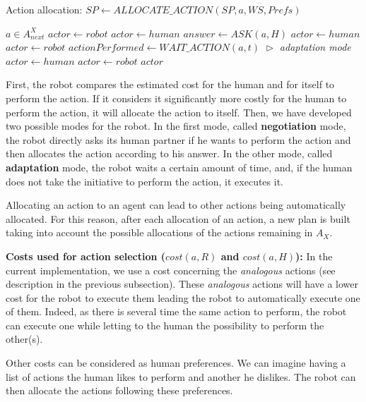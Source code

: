 \documentclass[english,a4paper,11pt,twoside]{StyleThese}
\begin{document}
\begin{algorithm}
\caption{Action allocation: $SP \leftarrow ALLOCATE\_ACTION(SP, a, WS, Prefs)$}
\label{alg:allocate}
\begin{algorithmic}
\REQUIRE $a \in A^X_{next}$
\STATE $actor \leftarrow robot$
\STATE $actor \leftarrow human$
\STATE $answer \leftarrow ASK(a, H)$
\STATE $actor \leftarrow human$
\ELSE
\STATE $actor \leftarrow robot$
\ENDIF
\ELSE
\STATE $actionPerformed \leftarrow WAIT\_ACTION(a, t)$
\hfill \textit{$\vartriangleright$ adaptation mode}
\STATE $actor \leftarrow human$
\ELSE
\STATE $actor \leftarrow robot$
\ENDIF
\ENDIF
\RETURN $actor$
\end{algorithmic}
\end{algorithm}

First, the robot compares the estimated cost for the human and for itself to perform the action. If it considers it significantly more costly for the human to perform the action, it will allocate the action to itself. Then, we have developed two possible modes for the robot. In the first mode, called \textbf{negotiation} mode, the robot directly asks its human partner if he wants to perform the action and then allocates the action according to his answer. In the other mode, called \textbf{adaptation} mode, the robot waits a certain amount of time, and, if the human does not take the initiative to perform the action, it executes it. 

Allocating an action to an agent can lead to other actions being automatically allocated. For this reason, after each allocation of an action, a new plan is built taking into account the possible allocations of the actions remaining in $A_X$.

\textbf{Costs used for action selection ($cost(a, R)$ and $cost(a, H)$):}
In the current implementation, we use a cost concerning the \textit{analogous} actions (see description in the previous subsection). These \textit{analogous} actions will have a lower cost for the robot to execute them leading the robot to automatically execute one of them. Indeed, as there is several time the same action to perform, the robot can execute one while letting to the human the possibility to perform the other(s).

Other costs can be considered as human preferences. We can imagine having a list of actions the human likes to perform and another he dislikes. The robot can then allocate the actions following these preferences.
\end{document}
